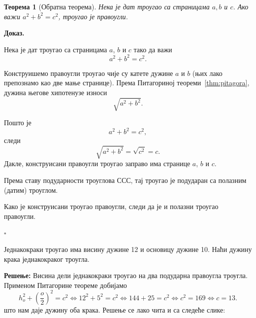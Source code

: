 \documentclass[11pt,a4paper]{article}
\newtheorem{theorem}{Теорема}
\begin{document}
\begin{theoremBox}
\begin{theorem}[Обратна теорема]
Нека је дат троугао са страницама $a,b$ и $c$. Ако важи $a^2 + b^2 = c^2$, троугао је правоугли.
\end{theorem}
\end{theoremBox}

\textbf{Доказ.} 

Нека је дат троугао са страницама $a$, $b$ и $c$ тако да важи \[ a^2+b^2=c^2. \] 

Конструишемо правоугли троугао чије су катете дужине $a$ и $b$ (њих лако препознамо као две мање странице).
Према Питагориној теореми~\ref{thm:pitagora}, дужина његове хипотенузе износи \[ \sqrt{a^2+b^2}. \] 

Пошто је \[ a^2+b^2=c^2, \] следи \[ \sqrt{a^2+b^2}=\sqrt{c^2}=c. \] 
Дакле, конструисани правоугли троугао заправо има странице $a$, $b$ и $c$. 

Према ставу подударности троуглова ССС, тај троугао је подударан са полазним (датим) троуглом. 

Како је конструисани троугао правоугли, следи да је и полазни троугао правоугли. 

\hfill $\square$

\vspace{0.5cm}


\begin{zadatakBox}
Једнакокраки троугао има висину дужине 12 и основицу дужине 10. Наћи дужину крака једнакокраког троугла.
\end{zadatakBox}

\textbf{Решење:}
Висина дели једнакокраки троугао на два подударна правоугла троугла. Применом Питагорине теореме добијамо
\[
h_o^2+(\frac{o}2)^2=c^2  \iff  12^2+5^2=c^2 \iff   144+25=c^2 \iff   c^2 = 169 \iff  c = 13.
\]
што нам даје дужину оба крака. Решење се лако чита и са следеће слике: 




\begin{center} 
\end{center}
\end{document}
